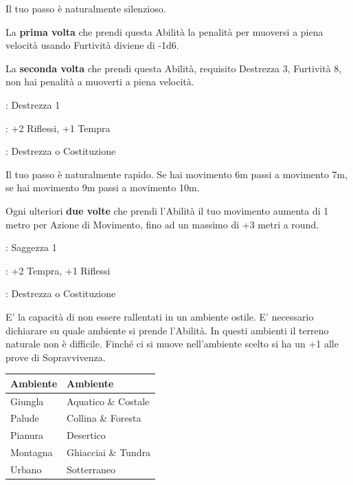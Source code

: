 \begin{multicols}{2}
Il tuo passo è naturalmente silenzioso.

La \textbf{prima volta} che prendi questa Abilità la penalità per muoversi a piena velocità usando Furtività diviene di -1d6.

La \textbf{seconda volta} che prendi questa Abilità, requisito Destrezza 3, Furtività 8, non hai penalità a muoverti a piena velocità.

\begin{description}[noitemsep, topsep=0pt, parsep=0pt, partopsep=0pt, leftmargin=0cm, labelwidth=2.5cm]
    \item[\textbf{Requisito}]: Destrezza 1
    \item[\textbf{Tiri Salvezza}]: +2 Riflessi, +1 Tempra
    \item[\textbf{Caratteristica}]: Destrezza o Costituzione
\end{description}

Il tuo passo è naturalmente rapido.
Se hai movimento 6m passi a movimento 7m, se hai movimento 9m passi a movimento 10m.

Ogni ulteriori \textbf{due volte} che prendi l'Abilità il tuo movimento aumenta di 1 metro per Azione di Movimento, fino ad un massimo di +3 metri a round.

\begin{description}[noitemsep, topsep=0pt, parsep=0pt, partopsep=0pt, leftmargin=0cm, labelwidth=2.5cm]
    \item[\textbf{Requisito}]: Saggezza 1
    \item[\textbf{Tiri Salvezza}]: +2 Tempra, +1 Riflessi
    \item[\textbf{Caratteristica}]: Destrezza o Costituzione
\end{description}

E' la capacità di non essere rallentati in un ambiente ostile. E' necessario dichiarare su quale ambiente si prende l'Abilità. In questi ambienti il terreno naturale non è difficile. Finché ci si muove nell'ambiente scelto si ha un +1 alle prove di Sopravvivenza.

\medskip

\noindent\begin{tabular}{l|l}
	\toprule
\rowcolor{gray!20}\textbf{Ambiente} & \textbf{Ambiente}\\
\toprule
Giungla & Aquatico \& Costale\\
\rowcolor{gray!20}Palude & Collina \& Foresta \\
Pianura & Desertico \\
\rowcolor{gray!20}Montagna & Ghiacciai \& Tundra \\
Urbano& Sotterraneo
\end{tabular}


\end{multicols}
